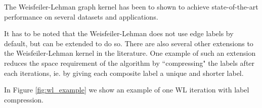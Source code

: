 The Weisfeiler-Lehman graph kernel has been to shown to achieve state-of-the-art performance on several datasets and applications.


It has to be noted that the Weisfeiler-Lehman does not use edge labels by default, but can be extended to do so.
There are also several other extensions to the Weisfeiler-Lehman kernel in the literature.
One example of such an extension reduces the space requirement of the algorithm by ``compressing" the labels after each iterations, ie. by giving each composite label a unique and shorter label.

In Figure \ref{fig:wl_example} we show an example of one WL iteration with label compression.


